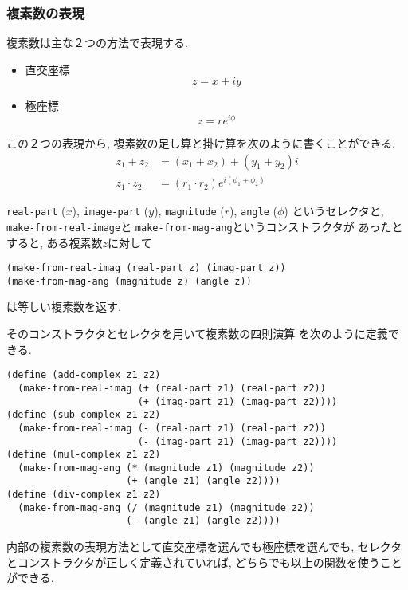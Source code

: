 \subsubsection{複素数の表現}
複素数は主な２つの方法で表現する.

\begin{itemize}
  \item 直交座標
    \[ z = x + iy \]
  \item 極座標
    \[ z = re^{i\phi}\]
\end{itemize}

この２つの表現から, 複素数の足し算と掛け算を次のように書くことができる.
\begin{align*}
  z_1 + z_2 &= (x_1 + x_2) + (y_1 + y_2)i\\
  z_1 \cdot z_2 &= (r_1 \cdot r_2) e^{i(\phi_1 + \phi_2)}
\end{align*}

\lstinline{real-part} ($x$), \lstinline{image-part} ($y$),
\lstinline{magnitude} ($r$), \lstinline{angle} ($\phi$)
というセレクタと, \\ \lstinline{make-from-real-image}と
\lstinline{make-from-mag-ang}というコンストラクタが
あったとすると, ある複素数$z$に対して

\begin{lstlisting}[basicstyle=\footnotesize]
(make-from-real-imag (real-part z) (imag-part z))
(make-from-mag-ang (magnitude z) (angle z))
\end{lstlisting}

は等しい複素数を返す.

そのコンストラクタとセレクタを用いて複素数の四則演算
を次のように定義できる.

\begin{lstlisting}[basicstyle=\footnotesize]
(define (add-complex z1 z2)
  (make-from-real-imag (+ (real-part z1) (real-part z2))
                       (+ (imag-part z1) (imag-part z2))))
(define (sub-complex z1 z2)
  (make-from-real-imag (- (real-part z1) (real-part z2))
                       (- (imag-part z1) (imag-part z2))))
(define (mul-complex z1 z2)
  (make-from-mag-ang (* (magnitude z1) (magnitude z2))
                     (+ (angle z1) (angle z2))))
(define (div-complex z1 z2)
  (make-from-mag-ang (/ (magnitude z1) (magnitude z2))
                     (- (angle z1) (angle z2))))
\end{lstlisting}
%
内部の複素数の表現方法として直交座標を選んでも極座標を選んでも,
セレクタとコンストラクタが正しく定義されていれば,
どちらでも以上の関数を使うことができる.
